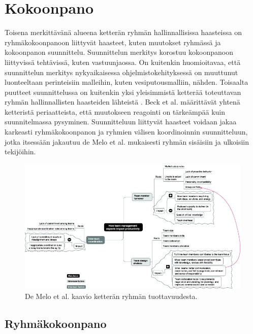 \chapter{Kokoonpano}

Toisena merkittävänä alueena ketterän ryhmän hallinnallisissa haasteissa on ryhmäkokoonpanoon liittyvät haasteet, kuten muutokset ryhmässä ja kokoonpanon suunnittelu. Suunnittelun merkitys korostuu kokoonpanoon liittyvissä tehtävissä, kuten vastuunjaossa. On kuitenkin huomioitavaa, että suunnittelun merkitys nykyaikaisessa ohjelmistokehityksessä on muuttunut luonteeltaan perinteisiin malleihin, kuten vesiputousmalliin, nähden. Toisaalta puutteet suunnittelussa on kuitenkin yksi yleisimmistä ketterää toteuttavan ryhmän hallinnallisten haasteiden lähteistä \cite{7872736}. Beck et al. \cite{beck2001agile} määrittävät yhtenä ketteristä periaatteista, että muutokseen reagointi on tärkeämpää kuin suunnitelmassa pysyminen. Suunnitteluun liittyvät haasteet voidaan jakaa karkeasti ryhmäkokoonpanon ja ryhmien välisen koordinoinnin suunnitteluun, jotka itsessään jakautuu de Melo et al. \cite{DEOMELO2013412} mukaisesti ryhmän sisäisiin ja ulkoisiin tekijöihin.

\begin{figure}[t] %
\centering 
\includegraphics[width=1.0\textwidth]{template/figures/demelo.JPG}
\caption{De Melo et al. \cite{DEOMELO2013412} kaavio ketterän ryhmän tuottavuudesta.\label{fig:demelo}}
\end{figure}

\section{Ryhmäkokoonpano}

